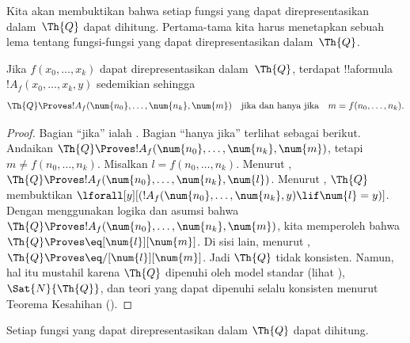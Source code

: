 \documentclass[../../../include/open-logic-section]{subfiles}
\begin{document}

Kita akan membuktikan bahwa setiap fungsi yang dapat direpresentasikan
dalam~$\Th{Q}$ dapat dihitung. Pertama-tama kita harus menetapkan sebuah lema
tentang fungsi-fungsi yang dapat direpresentasikan dalam~$\Th{Q}$.

\begin{lem}
  Jika $f(x_0, \dots, x_k)$ dapat direpresentasikan dalam~$\Th{Q}$, terdapat
  !!a{formula}~$!A_f(x_0, \dots, x_k, y)$ sedemikian sehingga
  \[
  \Th{Q} \Proves !A_f(\num{n_0}, \dots, \num{n_k}, \num{m})
  \quad\text{jika dan hanya jika}\quad m = f(n_0, \dots, n_k).
  \]
\end{lem}

\begin{proof}
  Bagian ``jika'' ialah
. Bagian ``hanya
jika'' terlihat sebagai berikut. Andaikan $\Th{Q} \Proves !A_f(\num{n_0},
\dots, \num{n_k}, \num{m})$, tetapi $m \neq f(n_0, \dots, n_k)$. Misalkan
$l = f(n_0, \dots, n_k)$. Menurut
, $\Th{Q}
\Proves !A_f(\num{n_0}, \dots, \num{n_k}, \num{l})$. Menurut
, $\Th{Q}$
membuktikan $\lforall[y][(!A_f(\num{n_0}, \dots, \num{n_k}, y) \lif
\num{l} = y)]$. Dengan menggunakan logika dan asumsi bahwa $\Th{Q} \Proves
!A_f(\num{n_0}, \dots, \num{n_k}, \num{m})$, kita memperoleh bahwa
$\Th{Q} \Proves \eq[\num{l}][\num{m}]$. Di sisi lain, menurut
, $\Th{Q} \Proves
\eq/[\num{l}][\num{m}]$. Jadi $\Th{Q}$ tidak konsisten. Namun, hal itu
mustahil karena $\Th{Q}$ dipenuhi oleh model standar (lihat
), $\Sat{N}{\Th{Q}}$, dan teori yang
dapat dipenuhi selalu konsisten menurut Teorema Kesahihan
().
\end{proof}

\begin{lem}
Setiap fungsi yang dapat direpresentasikan dalam $\Th{Q}$ dapat dihitung.
\end{lem}
\end{document}
